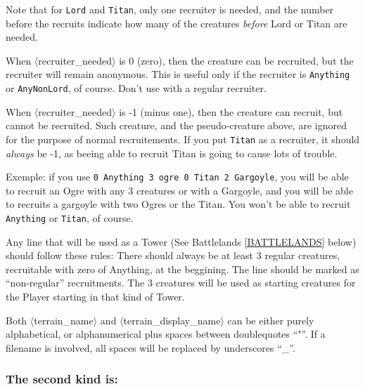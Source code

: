 \documentclass{article}
\begin{document}
Note that for \texttt{Lord} and \texttt{Titan}, only one recruiter is needed, and the number before the recruits indicate how many of the creatures \emph{before} Lord or Titan are needed.

When $\langle$recruiter\_needed$\rangle$ is 0 (zero), then the creature can be recruited, but the recruiter will remain anonymous. This is useful only if the recruiter is \texttt{Anything} or \texttt{AnyNonLord}, of course. Don't use with a regular recruiter.

When $\langle$recruiter\_needed$\rangle$ is -1 (minus one), then the creature can recruit, but cannot be recruited. Such creature, and the pseudo-creature above, are ignored for the purpose of normal recruitements. If you put \texttt{Titan} as a recruiter, it should \emph{always} be -1, as beeing able to recruit Titan is going to cause lots of trouble.

Exemple: if you use \texttt{0 Anything 3 ogre 0 Titan 2 Gargoyle}, you will be able to recruit an Ogre with any 3 creatures or with a Gargoyle, and you will be able to recruits a gargoyle with two Ogres or the Titan. You won't be able to recruit \texttt{Anything} or \texttt{Titan}, of course.


Any line that will be used as a Tower (See Battlelands \ref{BATTLELANDS} below) should follow these rules: There should always be at least 3 regular creatures, recruitable with zero of Anything, at the beggining. The line should be marked as ``non-regular'' recruitments. The 3 creatures will be used as starting creatures for the Player starting in that kind of Tower.

Both $\langle$terrain\_name$\rangle$ and $\langle$terrain\_display\_name$\rangle$ can be either purely alphabetical, or alphanumerical plus spaces between doublequotes ``"''. If a filename is involved, all spaces will be replaced by underscores ``\_''.

\subsubsection*{The second kind is:}
\end{document}
